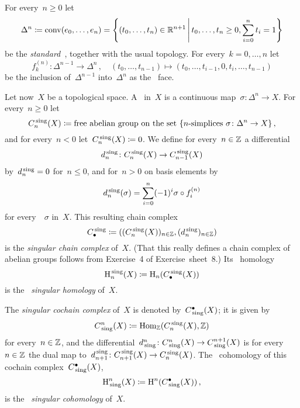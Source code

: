 \begin{example}
  For every~$n \geq 0$ let
  \[
              \Delta^n
    \defined  \conv(e_0, \dotsc, e_n)
    =         \left\{
                (t_0, \dotsc, t_n) \in \Real^{n+1}
              \suchthat*
                t_0, \dotsc, t_n \geq 0,
                \sum_{i=0}^n t_i = 1
              \right\}
  \]
  be the \emph{standard~}, together with the usual topology.
  For every~$k = 0, \dotsc, n$ let
  \[
            f^{(n)}_k
    \colon  \Delta^{n-1}
    \to     \Delta^n \,,
    \quad   (t_0, \dotsc, t_{n-1})
    \mapsto (t_0, \dotsc, t_{i-1}, 0, t_i, \dotsc, t_{n-1})
  \]
  be the inclusion of~$\Delta^{n-1}$ into~$\Delta^n$ as the~ face.
  
  Let now~$X$ be a topological space.
  A~ in~$X$ is a continuous map~$\sigma \colon \Delta^n \to X$.
  For every~$n \geq 0$ let
  \[
              C^\sing_n(X)
    \defined  \text{free abelian group on the set~$\{ \text{\simplices{$n$} $\sigma \colon \Delta^n \to X$} \}$} \,,
  \]
  and for every~$n < 0$ let~$C^{\,\mathrm{sing}}_n(X) \coloneqq 0$.
  We define for every~$n \in \mathbb{Z}$ a differential
  \[
    d^{\,\mathrm{sing}}_n
    \colon
    C^{\,\mathrm{sing}}_n(X)
    \to
    C^{\,\mathrm{sing}}_{n-1}(X)
  \]
  by~$d^{\,\mathrm{sing}}_n = 0$ for~$n \leq 0$, and for~$n > 0$ on basis elements by
  \[
      d^{\,\mathrm{sing}}_n(\sigma)
    = \sum_{i=0}^n (-1)^i \sigma \circ f^{(n)}_i
  \]
  for every~{}~$\sigma$ in~$X$.
  This resulting chain complex
  \[
              C_\bullet^{\,\mathrm{sing}}
    \coloneqq  ( (C^{\,\mathrm{sing}}_n(X))_{n \in \mathbb{Z}}, (d_n^{\,\mathrm{sing}})_{n \in \mathbb{Z}} )
  \]
  is the \emph{singular chain complex} of~$X$.
  (That this really defines a chain complex of abelian groups follows from Exercise~4 of Exercise~sheet~8.)
  Its~ homology
  \[
              \operatorname{H}_n^{\,\mathrm{sing}}(X)
    \coloneqq  \operatorname{H}_n( C_\bullet^{\,\mathrm{sing}}(X) )
  \]
  is the~ \emph{singular homology} of~$X$.
  
  The \emph{singular cochain complex} of~$X$ is denoted by~$C^\bullet_{\,\mathrm{sing}}(X)$;
  it is given by
  \[
              C^n_{\,\mathrm{sing}}(X)
    \coloneqq  \operatorname{Hom}_{\mathbb{Z}}( C^{\,\mathrm{sing}}_n(X), \mathbb{Z} )
  \]
  for every~$n \in \mathbb{Z}$, and the differential~$d^n_{\,\mathrm{sing}} \colon C^n_{\,\mathrm{sing}}(X) \to C^{n+1}_{\,\mathrm{sing}}(X)$ is for every~$n \in \mathbb{Z}$ the dual map to~$d^{\,\mathrm{sing}}_{n+1} \colon C_{n+1}^{\,\mathrm{sing}}(X) \to C_n^{\,\mathrm{sing}}(X)$.
  The~ cohomology of this cochain complex~$C^\bullet_{\,\mathrm{sing}}(X)$,
  \[
              \operatorname{H}^n_{\,\mathrm{sing}}(X)
    \coloneqq  \operatorname{H}^n( C^\bullet_{\,\mathrm{sing}}(X) ) \,,
  \]
  is the~ \emph{singular cohomology} of~$X$.
\end{example}


